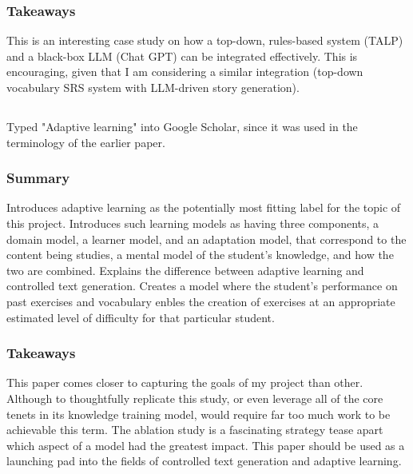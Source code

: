 \documentclass[
	letterpaper, %
]{jdf}
\begin{document}
\subsubsection{Takeaways}
This is an interesting case study on how a top-down, rules-based system (TALP) and a black-box LLM (Chat GPT) can be integrated effectively. This is encouraging, given that I am considering a similar integration (top-down vocabulary SRS system with LLM-driven story generation).

\subsection{}
Typed "Adaptive learning" into Google Scholar, since it was used in the terminology of the earlier paper.

\subsubsection{Summary}
Introduces adaptive learning as the potentially most fitting label for the topic of this project. Introduces such learning models as having three components, a domain model, a learner model, and an adaptation model, that correspond to the content being studies, a mental model of the student's knowledge, and how the two are combined. Explains the difference between adaptive learning and controlled text generation. Creates a model where the student's performance on past exercises and vocabulary enbles the creation of exercises at an appropriate estimated level of difficulty for that particular student.

\subsubsection{Takeaways}
This paper comes closer to capturing the goals of my project than other. Although to thoughtfully replicate this study, or even leverage all of the core tenets in its knowledge training model, would require far too much work to be achievable this term. The ablation study is a fascinating strategy tease apart which aspect of a model had the greatest impact. This paper should be used as a launching pad into the fields of controlled text generation and adaptive learning. 
\end{document}
